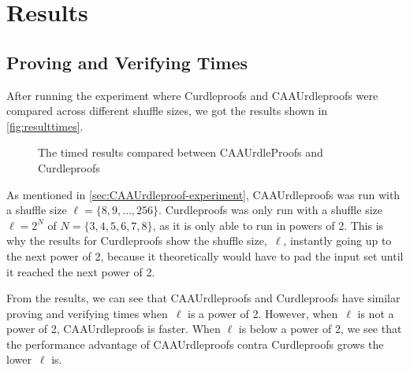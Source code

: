 \section{Results}\label{sec:results}
\subsection{Proving and Verifying Times}\label{subsec:results:provingverifying}

After running the experiment where Curdleproofs and CAAUrdleproofs were compared across different shuffle sizes, we got the results shown in \autoref{fig:resulttimes}.

\begin{figure}[!htb]
    \centering
    \qquad
    \caption{The timed results compared between CAAUrdleProofs and Curdleproofs}%
    \label{fig:resulttimes}%
\end{figure}

As mentioned in \autoref{sec:CAAUrdleproof-experiment}, CAAUrdleproofs was run with a shuffle size $\ell=\{8,9,\dots,256\}$.
Curdleproofs was only run with a shuffle size $\ell = 2^N$ of $N = \{3,4,5,6,7,8\}$, as it is only able to run in powers of 2.
This is why the results for Curdleproofs show the shuffle size,~$\ell$, instantly going up to the next power of 2, because it theoretically would have to pad the input set until it reached the next power of 2.

From the results, we can see that CAAUrdleproofs and Curdleproofs have similar proving and verifying times when~$\ell$ is a power of 2.
However, when~$\ell$ is not a power of 2, CAAUrdleproofs is faster.
When $\ell$ is below a power of 2, we see that the performance advantage of CAAUrdleproofs contra Curdleproofs grows the lower~$\ell$ is.

